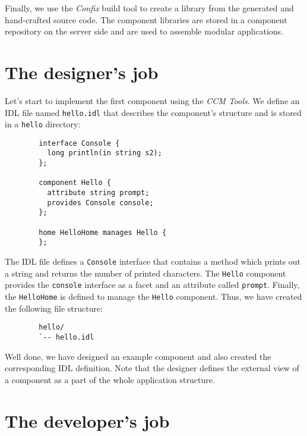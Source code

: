 Finally, we use the {\it Confix} build tool to create a library from the generated and
hand-crafted source code. The component libraries are stored in a component repository on the
server side and are used to assemble modular applications.

  

\section{The designer's job}

Let's start to implement the first component using the {\it CCM Tools}.
We define an IDL file named {\tt hello.idl} that describes the component's structure
and is stored in a {\tt hello} directory:
\begin{verbatim}
        interface Console {
          long println(in string s2);
        };

        component Hello {
          attribute string prompt;	
          provides Console console;
        };

        home HelloHome manages Hello {
        };
\end{verbatim}

The IDL file  defines a {\tt Console} interface that contains a method which prints 
out a string and returns the number of printed characters. 
The {\tt Hello} component provides the {\tt console} interface as a facet 
and an attribute called {\tt prompt}.
Finally, the {\tt HelloHome} is defined to manage the {\tt Hello} component.
Thus, we have created the following file structure:  
\begin{verbatim}
        hello/
        `-- hello.idl
\end{verbatim}

Well done, we have designed an example component and also created the corresponding
IDL definition. 
Note that the designer defines the external view of a component as a part of the
whole application structure.



\section{The developer's job}

